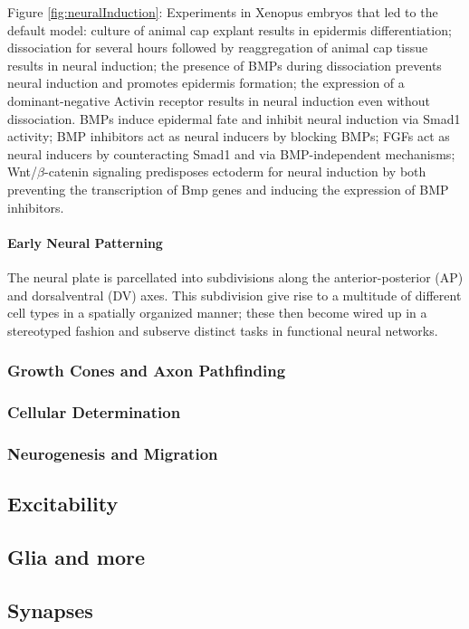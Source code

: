 \documentclass[12pt,article,oneside,a4paper]{memoir}
\begin{document}
Figure \ref{fig:neuralInduction}: Experiments in Xenopus embryos that led to the default model: culture of animal cap explant results in epidermis differentiation; dissociation for several hours followed by reaggregation of animal cap tissue results in neural induction; the presence of BMPs during dissociation prevents neural induction and promotes epidermis formation; the expression of a dominant-negative Activin receptor results in neural induction even without dissociation. BMPs induce epidermal fate and inhibit neural induction via Smad1 activity; BMP inhibitors act as neural inducers by blocking BMPs; FGFs act as neural inducers by counteracting Smad1 and via BMP-independent mechanisms; Wnt/$\beta$-catenin signaling predisposes ectoderm for neural induction by both preventing the transcription of Bmp genes and inducing the expression of BMP inhibitors.

\paragraph{Early Neural Patterning}
The neural plate is parcellated into subdivisions along the anterior-posterior (AP) and dorsalventral (DV) axes. This subdivision give rise to a multitude of different cell types in a spatially organized manner; these then become wired up in a stereotyped fashion and subserve distinct tasks in functional neural networks.

\subsubsection{Growth Cones and Axon Pathfinding}
\subsubsection{Cellular Determination}
\subsubsection{Neurogenesis and Migration}

\subsection{Excitability}
\subsection{Glia and more}
\subsection{Synapses}
\end{document}
